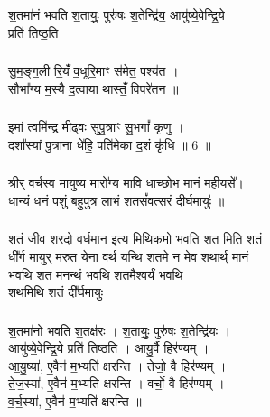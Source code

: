 \subsubsection{}
श॒तमा॑नं भवति श॒तायुः॒ पुरु॑षः श॒तेन्द्रि॑य॒ आयु॑ष्ये॒वेन्द्रि॒ये\\
प्रति॑ तिष्ठ॒ति\\
\subsubsection{}
सु॒म॒ङ्ग॒ली रि॒यंँ व॒धूरि॒माꣳ स॑मेत॒ पश्य॑त ।\\
सौभा᳚ग्य म॒स्यै द॒त्वाया थास्तंँ॒ विपरे॑तन ॥\\
\subsubsection{}
इ॒मां त्वमि॑न्द्र मीढ्वः सुपु॒त्राꣳ सु॒भगां᳚ कृणु ।\\
दशा᳚स्यां पु॒त्राना धे॑हि॒ पति॑मेका द॒शं कृ॑धि ॥ 6 ॥\\
\subsubsection{}
श्रीर् वर्चस्व मायुष्य मारो᳚ग्य मावि धाच्छोभ मानं महीयसे᳚।\\
धान्यं धनं पशुं बहुपुत्र लाभं शतसं᳚वत्सरं दीर्घमायुः॑ ॥\\
\subsubsection{}
शतं जीव शरदो वर्धमान इत्य मिथिकमो॑ भवति शत मिति शतं\\
धी᳚र्ग मायुर् मरुत येना वर्थ यन्थि शतमे न मेव शथार्थ् मानं \\
भवथि शत मनन्थं भवथि शतमैश्वर्यं भवथि\\
शथमिथि शतं दी᳚र्घमायुः\\
\subsubsection{}
श॒तमा॑नो भवति श॒तक्ष॑रः । श॒तायुः॒ पुरु॑षः श॒तेन्द्रि॑यः ।\\
आयु॑ष्ये॒वेन्द्रि॒ये प्रति॑ तिष्ठति । आयु॒र्वै हिर॑ण्यम् ।\\
आ॒यु॒ष्या॑, ए॒वैन॑ म॒भ्यति॑ क्षरन्ति । तेजो॒ वै हिर॑ण्यम् ।\\
ते॒ज॒स्या॑, ए॒वैन॑ म॒भ्यति॑ क्षरन्ति । वर्चो॒ वै हिर॑ण्यम् ।\\
व॒र्च॒स्या॑, ए॒वैन॑ म॒भ्यति॑ क्षरन्ति ॥\\
